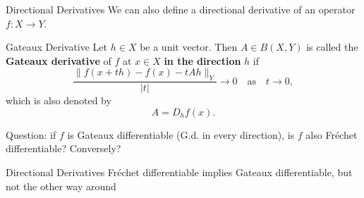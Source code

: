 \documentclass[]{beamer}
\begin{document}
	\begin{frame}{Directional Derivatives}
		We can also define a directional derivative of an operator $f : X \to Y$.
		
		\begin{block}{Gateaux Derivative}
			Let $h \in X$ be a unit vector. Then $A \in B(X,Y)$ is called the \textbf{Gateaux derivative} of $f$ at $x \in X$ \textbf{in the direction} $h$ if
			\begin{equation*}
				\frac{\lVert f(x+th) - f(x) - tAh\rVert_Y}{|t|} \to 0 \quad\text{as}\quad t\to 0,
			\end{equation*}
			which is also denoted by
			\begin{equation*}
				A = D_hf(x).
			\end{equation*}
		\end{block}
		\pause
		\vfill
		Question: if $f$ is Gateaux differentiable (G.d. in every direction), is $f$ also Fréchet differentiable? Conversely?
	\end{frame}
	
	\begin{frame}{Directional Derivatives}
		Fréchet differentiable implies Gateaux differentiable, but not the other way around
	\end{frame}
\end{document}
